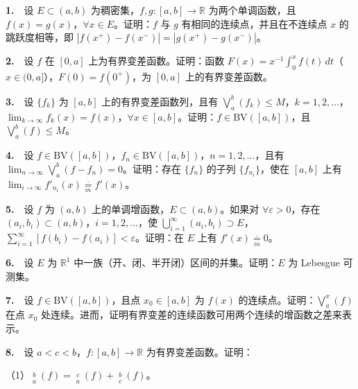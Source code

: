 \documentclass[11pt,a4paper]{article}
\begin{document}
\par{}\noindent \textbf{1.}　设 \(E\subset(a,b)\) 为稠密集，\(f,g:[a,b]\to\mathbb R\) 为两个单调函数，且 \(f(x)=g(x)\)，\(\forall x\in E\)。证明：\(f\) 与 \(g\) 有相同的连续点，并且在不连续点 \(x\) 的跳跃度相等，即 \(|f(x^+)-f(x^-)|=|g(x^+)-g(x^-)|\)。

\par{}\noindent \textbf{2.}　设 \(f\) 在 \([0,a]\) 上为有界变差函数。证明：函数 \(F(x)=x^{-1}\int_0^x f(t)\,dt\)（\(x\in(0,a]\)），\(F(0)=f(0^+)\)，为 \([0,a]\) 上的有界变差函数。

\par{}\noindent \textbf{3.}　设 \(\{f_k\}\) 为 \([a,b]\) 上的有界变差函数列，且有 \(\bigvee_a^b(f_k)\le M\)，\(k=1,2,\ldots\)，\(\lim_{k\to\infty}f_k(x)=f(x)\)，\(\forall x\in[a,b]\)。证明：\(f\in\mathrm{BV}([a,b])\)，且 \(\bigvee_a^b(f)\le M\)。

\par{}\noindent \textbf{4.}　设 \(f\in\mathrm{BV}([a,b])\)，\(f_n\in\mathrm{BV}([a,b])\)，\(n=1,2,\ldots\)，且有 \(\lim_{n\to\infty}\bigvee_a^b(f-f_n)=0\)。证明：存在 \(\{f_n\}\) 的子列 \(\{f_{n_i}\}\)，使在 \([a,b]\) 上有 \(\lim_{i\to\infty} f'_{n_i}(x)\underset{m}{\overset{\cdot}{=}} f'(x)\)。

\par{}\noindent \textbf{5.}　设 \(f\) 为 \((a,b)\) 上的单调增函数，\(E\subset(a,b)\)。如果对 \(\forall\varepsilon>0\)，存在 \((a_i,b_i)\subset(a,b)\)，\(i=1,2,\ldots\)，使 \(\bigcup_{i=1}^\infty(a_i,b_i)\supset E\)，\(\sum_{i=1}^\infty[f(b_i)-f(a_i)]<\varepsilon\)。证明：在 \(E\) 上有 \(f'(x)\underset{m}{\overset{\cdot}{=}}0\)。

\par{}\noindent \textbf{6.}　设 \(E\) 为 \(\mathbb R^1\) 中一族（开、闭、半开闭）区间的并集。证明：\(E\) 为 Lebesgue 可测集。

\par{}\noindent \textbf{7.}　设 \(f\in\mathrm{BV}([a,b])\)，且点 \(x_0\in[a,b]\) 为 \(f(x)\) 的连续点。证明：\(\bigvee_a^x(f)\) 在点 \(x_0\) 处连续。进而，证明有界变差的连续函数可用两个连续的增函数之差来表示。

\par{}\noindent \textbf{8.}　设 \(a<c<b\)，\(f:[a,b]\to\mathbb R\) 为有界变差函数。证明：

（1）\(\mathop{\bigvee\nolimits^{+}}\limits_a^b(f)=\mathop{\bigvee\nolimits^{+}}\limits_a^c(f)+\mathop{\bigvee\nolimits^{+}}\limits_c^b(f)\)。
\end{document}
